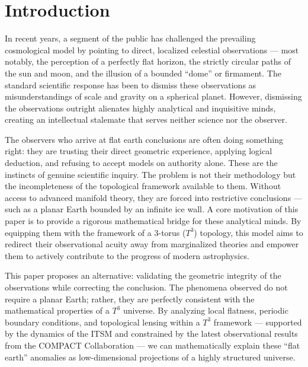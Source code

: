 \documentclass[aps,prd,11pt,onecolumn,superscriptaddress,nofootinbib,floatfix]{revtex4-2}
\begin{document}
\maketitle

\section{Introduction}
\label{sec:intro}

In recent years, a segment of the public has challenged the prevailing cosmological model by pointing to direct, localized celestial observations --- most notably, the perception of a perfectly flat horizon, the strictly circular paths of the sun and moon, and the illusion of a bounded ``dome'' or firmament. The standard scientific response has been to dismiss these observations as misunderstandings of scale and gravity on a spherical planet. However, dismissing the observations outright alienates highly analytical and inquisitive minds, creating an intellectual stalemate that serves neither science nor the observer.

The observers who arrive at flat earth conclusions are often doing something right: they are trusting their direct geometric experience, applying logical deduction, and refusing to accept models on authority alone. These are the instincts of genuine scientific inquiry. The problem is not their methodology but the incompleteness of the topological framework available to them. Without access to advanced manifold theory, they are forced into restrictive conclusions --- such as a planar Earth bounded by an infinite ice wall. A core motivation of this paper is to provide a rigorous mathematical bridge for these analytical minds. By equipping them with the framework of a 3-torus ($T^3$) topology, this model aims to redirect their observational acuity away from marginalized theories and empower them to actively contribute to the progress of modern astrophysics.

This paper proposes an alternative: validating the geometric integrity of the observations while correcting the conclusion. The phenomena observed do not require a planar Earth; rather, they are perfectly consistent with the mathematical properties of a $T^3$ universe. By analyzing local flatness, periodic boundary conditions, and topological lensing within a $T^3$ framework --- supported by the dynamics of the ITSM and constrained by the latest observational results from the COMPACT Collaboration \cite{compact_promise} --- we can mathematically explain these ``flat earth'' anomalies as low-dimensional projections of a highly structured universe.
\end{document}

